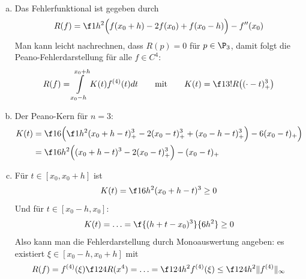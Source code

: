\documentclass[a4paper]{scrartcl}
\begin{document}
\begin{aufgabe}~

	\begin{enumerate}[a)]
		\item
			Das Fehlerfunktional ist gegeben durch
			\[
				R(f) = \f 1{h^2} \Big( f(x_0+h) - 2f(x_0) + f(x_0-h) \Big) - f''(x_0)
			\]
			Man kann leicht nachrechnen, dass $R(p)=0$ für $p\in \P_3$, damit folgt die Peano-Fehlerdarstellung für alle $f\in C^4$:
			\[
				R(f) = \int\limits_{x_0-h}^{x_0+h} K(t) f^{(4)}(t) dt
				\qquad\text{mit}\qquad
				K(t) = \f 1{3!}R\big((\cdot - t)_+^3\big)
			\]
		\item
			Der Peano-Kern für $n=3$:
			\begin{align*}
				K(t) 
				&= \f 16 \Big( \f 1{h^2} (x_0+h-t)_+^3 - 2(x_0-t)_+^3 + (x_0-h-t)_+^3 \Big) - 6(x_0-t)_+ \Big) \\
				&= \f 1{6h^2} \Big( (x_0 + h - t)^3 - 2(x_0 - t)_+^3 \Big) - (x_0 - t)_+
			\end{align*}
		\item
			Für $t\in[x_0,x_0+h]$ ist
			\[
				K(t) = \f 1{6h^2}(x_0+h-t)^3 \ge 0
			\]
			Und für $t\in[x_0-h,x_0]$:
			\[
				K(t) = \dotsc = \f {(h+t-x_0)^3}{6h^2} \ge 0
			\]
			Also kann man die Fehlerdarstellung durch Monoauswertung angeben:
			es existiert $\xi \in [x_0-h, x_0+h]$ mit
			\[
				R(f) = f^{(4)}(\xi) \f 1{24} R(x^4) = \dotsc = \f 1{24}h^2 f^{(4)}(\xi) \le \f 1{24} h^2 \|f^{(4)}\|_\infty
			\]
	\end{enumerate}		
\end{aufgabe}
\end{document}
